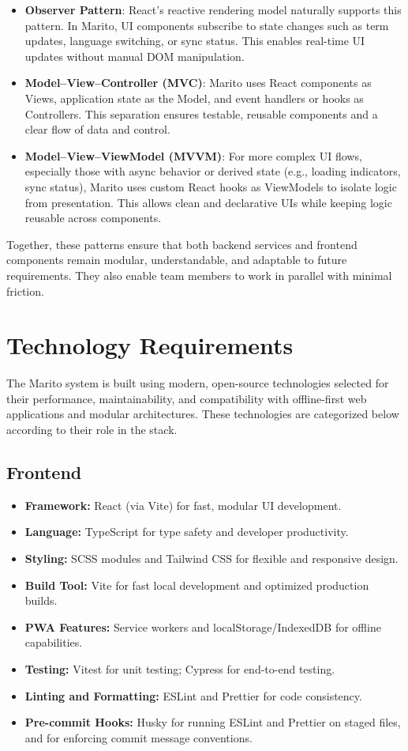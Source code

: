 \documentclass[12pt]{article}
\begin{document}
\begin{itemize}
    \item \textbf{Observer Pattern}: React’s reactive rendering model naturally supports this pattern. In Marito, UI components subscribe to state changes such as term updates, language switching, or sync status. This enables real-time UI updates without manual DOM manipulation.

    \item \textbf{Model–View–Controller (MVC)}: Marito uses React components as Views, application state as the Model, and event handlers or hooks as Controllers. This separation ensures testable, reusable components and a clear flow of data and control.

    \item \textbf{Model–View–ViewModel (MVVM)}: For more complex UI flows, especially those with async behavior or derived state (e.g., loading indicators, sync status), Marito uses custom React hooks as ViewModels to isolate logic from presentation. This allows clean and declarative UIs while keeping logic reusable across components.
\end{itemize}
\newline
Together, these patterns ensure that both backend services and frontend components remain modular, understandable, and adaptable to future requirements. They also enable team members to work in parallel with minimal friction.


\section{Technology Requirements}
The Marito system is built using modern, open-source technologies selected for their performance, maintainability, and compatibility with offline-first web applications and modular architectures. These technologies are categorized below according to their role in the stack.
\subsection{Frontend}
\begin{itemize}
  \item \textbf{Framework:} React (via Vite) for fast, modular UI development.
  \item \textbf{Language:} TypeScript for type safety and developer productivity.
  \item \textbf{Styling:} SCSS modules and Tailwind CSS for flexible and responsive design.
  \item \textbf{Build Tool:} Vite for fast local development and optimized production builds.
  \item \textbf{PWA Features:} Service workers and localStorage/IndexedDB for offline capabilities.
  \item \textbf{Testing:} Vitest for unit testing; Cypress for end-to-end testing.
  \item \textbf{Linting and Formatting:} ESLint and Prettier for code consistency.
  \item \textbf{Pre-commit Hooks:} Husky for running ESLint and Prettier on staged files, and for enforcing commit message conventions.
\end{itemize}
\end{document}
